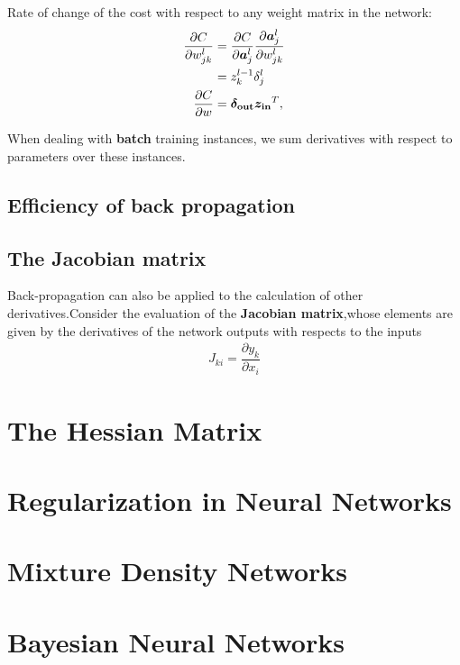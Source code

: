 Rate of change of the cost with respect to any weight matrix in the network:
\begin{align}
    \frac{\partial C}{\partial w^l_{jk}} 
&= \frac{\partial C}{\partial \vec{a}^l_j}\frac{\partial \vec{a}^l_j}{\partial w^l_{jk}}\\
&= z^{l-1}_k \delta^l_j \\
\frac{\partial C}{\partial w} &= \vec{\delta_{\rm out}} \vec{z_{\rm in}}^T,
\end{align}

When dealing with \textbf{batch} training instances, we sum derivatives with respect to parameters over these instances.

\subsection{Efficiency of back propagation}

\subsection{The Jacobian matrix}
Back-propagation can also be applied to the calculation of other derivatives.Consider the evaluation of the \textbf{Jacobian matrix},whose elements are given by the derivatives of the network outputs with respects to the inputs
\begin{align}
    J_{ki}=\dfrac{\partial y_k}{\partial x_i}
\end{align}


\section{The Hessian Matrix}

\section{Regularization in Neural Networks}










\section{Mixture Density Networks}

\section{Bayesian Neural Networks}
